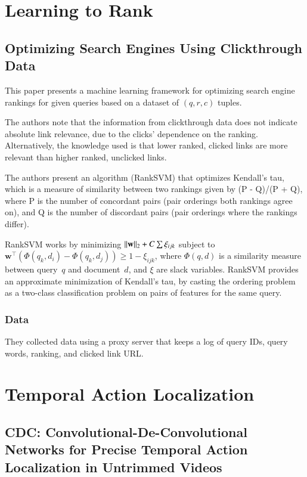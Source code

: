 \documentclass[a4paper, 12pt]{article}
\DeclarePairedDelimiter\norm{\lVert}{\rVert}%
\begin{document}
\section{Learning to Rank}


\subsection{Optimizing Search Engines Using Clickthrough
            Data~\cite{joachims-optimizing-2002}}

This paper presents a machine learning framework for optimizing search engine
rankings for given queries based on a dataset of $(q, r, c)$ tuples.

The authors note that the information from clickthrough data does not indicate
absolute link relevance, due to the clicks' dependence on the ranking.
Alternatively, the knowledge used is that lower ranked, clicked links are more
relevant than higher ranked, unclicked links.

The authors present an algorithm (RankSVM) that optimizes Kendall's tau, which
is a measure of similarity between two rankings given by (P - Q)/(P + Q), where
P is the number of concordant pairs (pair orderings both rankings agree on),
and Q is the number of discordant pairs (pair orderings where the rankings
differ).

RankSVM works by minimizing $\norm{\mathbf{w}}_2 + C\sum \xi_{ijk}$ subject to
$\mathbf{w}^\intercal (\Phi(q_k, d_i) - \Phi(q_k, d_j)) \geq 1 - \xi_{ijk}$,
where $\Phi(q, d)$ is a similarity measure between query~$q$ and document~$d$,
and $\xi$ are slack variables. RankSVM provides an approximate minimization of
Kendall's tau, by casting the ordering problem as a two-class classification
problem on pairs of features for the same query.


\subsubsection{Data}

They collected data using a proxy server that keeps a log of query IDs, query
words, ranking, and clicked link URL.


\section{Temporal Action Localization}


\subsection{CDC\@: Convolutional-De-Convolutional Networks for Precise Temporal
            Action Localization in Untrimmed
            Videos~\citet{DBLP:journals/corr/ShouCZMC17}}
\end{document}
